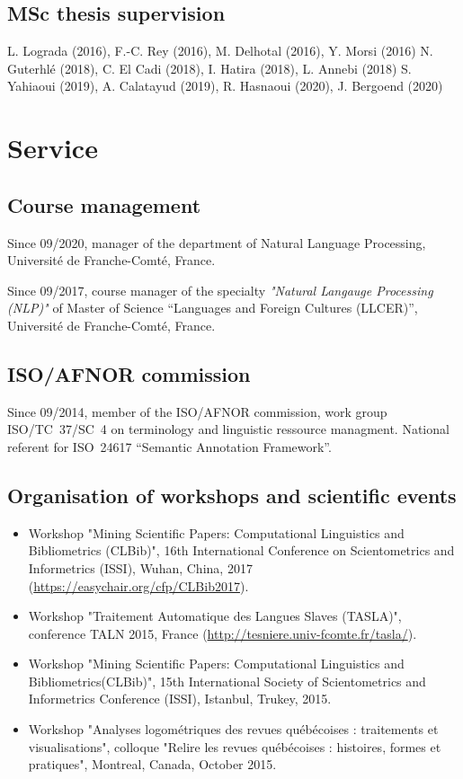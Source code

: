 \documentclass[11pt,a4paper,roman]{moderncv}
\begin{document}
\subsection{MSc thesis supervision}

 L. Lograda (2016), F.-C. Rey (2016), M. Delhotal (2016), Y. Morsi (2016)
	N. Guterhlé (2018), C. El Cadi (2018), I. Hatira (2018), L. Annebi (2018)
	S. Yahiaoui (2019), A. Calatayud (2019), R. Hasnaoui (2020), J. Bergoend (2020)








\section{Service}

\subsection{Course management}

Since 09/2020, manager of the department of Natural Language Processing, Université de Franche-Comté, France.

Since 09/2017, course manager of the specialty \textit{"Natural Langauge Processing (NLP)"} of Master of Science “Languages and Foreign Cultures (LLCER)”, Université de Franche-Comté, France.


\subsection{ISO/AFNOR commission}

Since 09/2014, member of the ISO/AFNOR commission, work group ISO/TC~37/SC~4 on terminology and linguistic ressource managment. National referent for ISO~24617 “Semantic Annotation Framework”.


\subsection{Organisation of workshops and scientific events}

\begin{itemize}
	\item Workshop "Mining Scientific Papers: Computational Linguistics and Bibliometrics ({CLBib})", 16th International Conference on Scientometrics and Informetrics (ISSI), Wuhan, China, 2017 (\url{https://easychair.org/cfp/CLBib2017}).
	\item Workshop "Traitement Automatique des Langues Slaves ({TASLA})", conference TALN 2015, France (\url{http://tesniere.univ-fcomte.fr/tasla/}).
	\item Workshop "Mining Scientific Papers: Computational Linguistics and Bibliometrics({CLBib})",
							15th International Society of Scientometrics and Informetrics Conference (ISSI), Istanbul, Trukey, 2015.
	\item Workshop "Analyses logométriques des revues québécoises : traitements et visualisations", colloque
							"Relire les revues québécoises : histoires, formes et pratiques", Montreal, Canada, October 2015.
\end{itemize}
\end{document}
